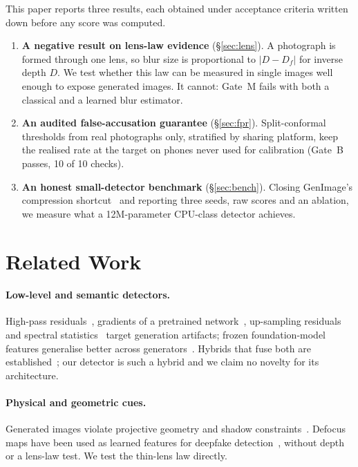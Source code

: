 \documentclass[10pt,twocolumn]{article}
\begin{document}
This paper reports three results, each obtained under acceptance criteria
written down before any score was computed.
\begin{enumerate}\itemsep2pt
  \item \textbf{A negative result on lens-law evidence} (\S\ref{sec:lens}).
  A photograph is formed through one lens, so blur size is proportional to
  $|D - D_f|$ for inverse depth $D$. We test whether this law can be measured
  in single images well enough to expose generated images. It cannot:
  Gate~M fails with both a classical and a learned blur estimator.
  \item \textbf{An audited false-accusation guarantee} (\S\ref{sec:fpr}).
  Split-conformal thresholds from real photographs only, stratified by
  sharing platform, keep the realised rate at the target on phones never used
  for calibration (Gate~B passes, 10 of 10 checks).
  \item \textbf{An honest small-detector benchmark} (\S\ref{sec:bench}).
  Closing GenImage's compression shortcut~\cite{grommelt2024fake} and
  reporting three seeds, raw scores and an ablation, we measure what a
  12M-parameter CPU-class detector achieves.
\end{enumerate}

\section{Related Work}
\paragraph{Low-level and semantic detectors.}
High-pass residuals~\cite{fridrich2012rich}, gradients of a pretrained
network~\cite{tan2023lgrad}, up-sampling residuals~\cite{tan2024npr} and
spectral statistics~\cite{durall2020watch,frank2020leveraging} target
generation artifacts; frozen foundation-model features generalise better
across generators~\cite{ojha2023universal,cozzolino2024raising,liu2024fatformer}.
Hybrids that fuse both are established~\cite{yan2025sanity,cheng2025cospy}; our
detector is such a hybrid and we claim no novelty for its architecture.

\paragraph{Physical and geometric cues.}
Generated images violate projective geometry and shadow
constraints~\cite{sarkar2024shadows}. Defocus maps have been used as learned
features for deepfake detection~\cite{jeon2025defocus}, without depth or a
lens-law test. We test the thin-lens law directly.
\end{document}
